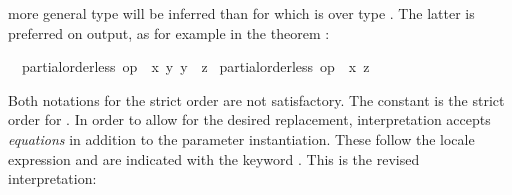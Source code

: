 \begin{isabellebody}
\begin{isamarkuptext}
{  more general type will be inferred than for  which
  is over type .}
  The latter is preferred on output, as for example in the theorem
  : \begin{isabelle}%
\ \ {}partial{}order{}less\ op\ {}\ {}x\ {}y{}\ {}y\ {}\ {}z{}\isanewline
{}\ partial{}order{}less\ op\ {}\ {}x\ {}z%
\end{isabelle}
  Both notations for the strict order are not satisfactory.  The
  constant  is the strict order for .
  In order to allow for the desired replacement, interpretation
  accepts \emph{equations} in addition to the parameter instantiation.
  These follow the locale expression and are indicated with the
  keyword .  This is the revised interpretation:%
\end{isamarkuptext}%
\isamarkuptrue%
%
\isadelimtheory
%
\endisadelimtheory
%
\isatagtheory
{}\isamarkupfalse%
%
\endisatagtheory
{\isafoldtheory}%
%
\isadelimtheory
%
\endisadelimtheory
\isanewline
\end{isabellebody}%
